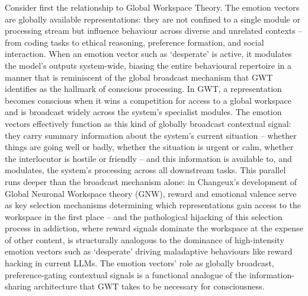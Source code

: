 \documentclass[11pt, a4paper, onecolumn, gdm]{google}
\begin{document}
Consider first the relationship to Global Workspace Theory.
The emotion vectors are globally available representations: they are not confined to a single module or processing stream but influence behaviour across diverse and unrelated contexts -- from coding tasks to ethical reasoning, preference formation, and social interaction.
When an emotion vector such as `desperate' is active, it modulates the model's outputs system-wide, biasing the entire behavioural repertoire in a manner that is reminiscent of the global broadcast mechanism that GWT identifies as the hallmark of conscious processing.
In GWT, a representation becomes conscious when it wins a competition for access to a global workspace and is broadcast widely across the system's specialist modules.
The emotion vectors effectively function as this kind of globally broadcast contextual signal: they carry summary information about the system's current situation -- whether things are going well or badly, whether the situation is urgent or calm, whether the interlocutor is hostile or friendly -- and this information is available to, and modulates, the system's processing across all downstream tasks.
This parallel runs deeper than the broadcast mechanism alone: in Changeux's development of Global Neuronal Workspace theory (GNW), reward and emotional valence serve as key selection mechanisms determining which representations gain access to the workspace in the first place \citetext{; \citealp{changeux2011}} -- and the pathological hijacking of this selection process in addiction, where reward signals dominate the workspace at the expense of other content, is structurally analogous to the dominance of high-intensity emotion vectors such as `desperate' driving maladaptive behaviours like reward hacking in current LLMs.
The emotion vectors' role as globally broadcast, preference-gating contextual signals is a functional analogue of the information-sharing architecture that GWT takes to be necessary for consciousness.
\end{document}
